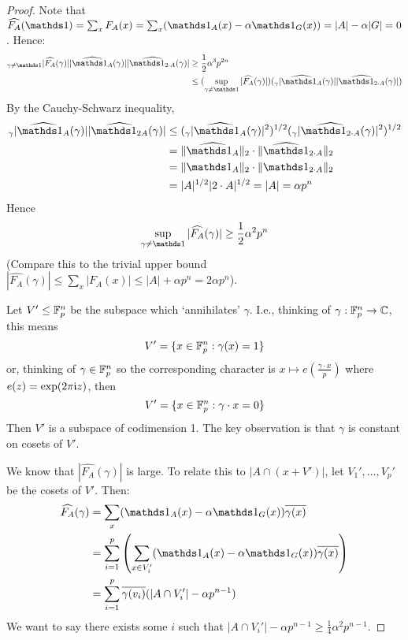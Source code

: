 \documentclass[10pt,a4paper]{article}
\let\E\relax
\DeclareMathOperator*{\E}{\raisebox{-0.45em}{\text{\huge $\mathds{E}$}}}
\begin{document}
\begin{proof}
  Note that $\hat{F_A}(\one) = \sum_x F_A(x) = \sum_x (\one_A(x)-\alpha \one_G(x)) = |A| - \alpha |G| = 0$. Hence:
  \begin{align*}
    \E_{\gamma \neq \one} |\hat{F_A}(\gamma)||\hat{\one_A}(\gamma)||\hat{\one_{2\cdot A}}(\gamma)| &\geq \frac{1}{2}\alpha^3 p^{2n} \\
    &\leq (\sup_{\gamma \neq \one} |\hat{F_A}(\gamma)|)(\E_\gamma |\hat{\one_A}(\gamma)||\hat{\one_{2\cdot A}}(\gamma)|)
  \end{align*}
  By the Cauchy-Schwarz inequality,
  \begin{align*}
    \E_\gamma |\hat{\one_A}(\gamma)||\hat{\one_{2A}}(\gamma)| &\leq (\E_\gamma |\hat{\one_A}(\gamma)|^2)^{1/2}(\E_\gamma|\hat{\one_{2\cdot A}}(\gamma)|^2)^{1/2}\\
    &= \norm{\hat{\one_A}}_2 \cdot \norm{\hat{\one}_{2\cdot A}}_2 \\
    &= \norm{\one_A}_2 \cdot \norm{\one_{2\cdot A}}_2 \\
    &= |A|^{1/2} |2\cdot A|^{1/2} = |A| = \alpha p^n
  \end{align*}
  Hence
  \[\sup_{\gamma \neq \one}|\hat{F_A}(\gamma)| \geq \frac{1}{2}\alpha^2 p^n\]
  (Compare this to the trivial upper bound $|\hat{F_A}(\gamma)| \leq \sum_x |F_A(x)| \leq |A|+\alpha p^n = 2\alpha p^n$).

  Let $V' \leq \mathbb{F}_p^n$ be the subspace which `annihilates' $\gamma$. I.e., thinking of $\gamma:\mathbb{F}_p^n \to \mathbb{C}$, this means
  \[V' = \{x \in \mathbb{F}_p^n : \gamma(x) = 1\}\]
  or, thinking of $\gamma \in \mathbb{F}_p^n$ so the corresponding character is $x \mapsto e\left(\frac{\gamma\cdot x}{p}\right)$ where $e(z) = \exp(2\pi\mathfrak{i} z)$, then
  \[V' = \{x \in \mathbb{F}_p^n : \gamma \cdot x = 0\}\]
  Then $V'$ is a subspace of codimension 1. The key observation is that $\gamma$ is constant on cosets of $V'$.

  We know that $|\hat{F_A}(\gamma)|$ is large. To relate this to $|A\cap (x+ V')|$, let $V_1', \ldots, V_p'$ be the cosets of $V'$. Then:
  \begin{align*}
    \hat{F_A}(\gamma) &= \sum_x(\one_A(x)-\alpha \one_G(x)) \overline{\gamma(x)}\\
    &= \sum_{i=1}^p\left( \sum_{x \in V_i'}(\one_A(x)-\alpha \one_G(x))\overline{\gamma(x)}\right)\\
    &= \sum_{i=1}^p \overline{\gamma(v_i)}(|A\cap V_i'| - \alpha p^{n-1})
  \end{align*}
  We want to say there exists some $i$ such that $|A\cap V_i'| - \alpha p^{n-1} \geq \frac{1}{4}\alpha^2 p^{n-1}$.


\end{proof}
\end{document}
